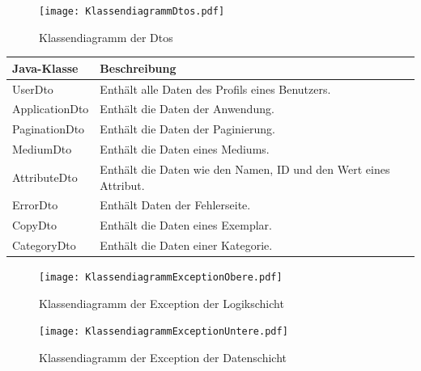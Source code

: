 \documentclass{article}
\begin{document}
\begin{center}
    \begin{figure}[H]
        \texttt{[image: KlassendiagrammDtos.pdf]}
        \caption{Klassendiagramm der Dtos  }
        \label{fig:Dtos- Klassendiagramm}
    \end{figure}
\end{center}

\begin{center}
    \begin{table}
        \begin{tabular} { |p{}|p{}| }
            \hline
            Java-Klasse & Beschreibung  \\
            \hline\hline
            UserDto & Enthält alle Daten des Profils eines Benutzers. \\
            \hline
            ApplicationDto & Enthält die Daten der Anwendung. \\
            \hline
            PaginationDto & Enthält die Daten der Paginierung. \\
            \hline
            MediumDto & Enthält die Daten eines Mediums. \\
            \hline
            AttributeDto & Enthält die Daten wie den Namen, ID und den Wert eines Attribut.\\
            \hline
            ErrorDto & Enthält Daten der Fehlerseite. \\
            \hline
            CopyDto & Enthält die   Daten eines Exemplar. \\
            \hline
            CategoryDto & Enthält die Daten einer Kategorie. \\
            \hline
        \end{tabular}
    \end{table}
\end{center}

\begin{center}
    \begin{figure}[H]
        \texttt{[image: KlassendiagrammExceptionObere.pdf]}
        \caption{Klassendiagramm der Exception der Logikschicht }
        \label{fig:Dtos- Klassendiagramm}
    \end{figure}
\end{center}
\begin{center}
    \begin{figure}[H]
        \texttt{[image: KlassendiagrammExceptionUntere.pdf]}
        \caption{Klassendiagramm der Exception der Datenschicht }
        \label{fig:Dtos- Klassendiagramm}
    \end{figure}
\end{center}
\end{document}
